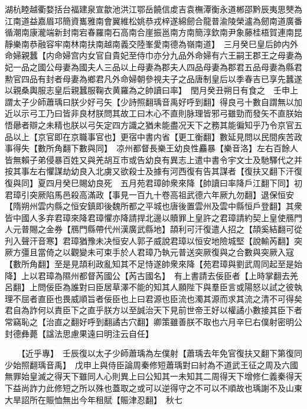 湖杭睦越衢婺括台福建泉宣歙池洪江鄂岳饒信䖍吉袁橅潭衡永道郴邵黔辰夷思僰為江南道益嘉眉邛簡資巂雅南會翼維松姚恭戎梓遂綿劒合龍普渝陵榮瀘為劒南道廣番循潮南康瀧端新封南宕春羅南石高南合崖振邕南方南簡淳欽南尹象藤桂梧賀連南昆靜樂南恭融容牢南林南扶南越南義交陸峯愛南德為嶺南道】　三月癸巳皇后帥内外命婦親蠶【内命婦宫内女官自貴妃至侍巾亦分九品外命婦有六王嗣王郡王之母妻為妃一品之國公母妻為國夫人三品以上母妻為郡夫人四品母妻為郡君五品母妻為縣君勲官四品有封者母妻為鄉君凡外命婦朝參視夫子之品唐制皇后以季春吉已享先蠶遂以親桑輿服志皇后親蠶服鞠衣黄羅為之帥讀曰率】　閏月癸丑朔日有食之　壬申上謂太子少師蕭瑀曰朕少好弓矢【少詩照翻瑀音禹好呼到翻】得良弓十數自謂無以加近以示弓工乃曰皆非良材朕問其故工曰木心不直則脉理皆邪弓雖勁而發矢不直朕始悟曏者辯之未精也朕以弓矢定四方識之猶未能盡况天下之務其能徧知乎乃令京官五品以上【京官即在京職事官也】更宿中書内省【更工衡翻】數延見問以民間疾苦政事得失【數所角翻下數與同】　凉州都督長樂王幼良性麤暴【樂音洛】左右百餘人皆無賴子弟侵暴百姓又與羌胡互市或告幼良有異志上遣中書令宇文士及馳驛代之并按其事左右懼謀劫幼良入北虜又欲殺士及據有河西復有告其謀者【復扶又翻下汗復復與同】夏四月癸巳賜幼良死　五月苑君璋帥衆來降【帥讀曰率降戶江翻下同】初君璋引突厥陷馬邑殺高滿政【事見一百九十卷高祖武德六年厥九勿翻】退保恒安【隋朔州雲内縣之恒安鎮即後魏所都之平城也唐後置雲州及雲中縣恒戶登翻】其衆皆中國人多弃君璋來降君璋懼亦降請捍北邊以贖罪上皇許之君璋請約契上皇使鴈門人元普賜之金券【鴈門縣帶代州漢廣武縣地】頡利可汗復遣人招之【頡奚結翻可從刋入聲汗音寒】君璋猶豫未决恒安人郭子威說君璋以恒安地險城堅【說輸芮翻】突厥方彊且當倚之以觀變未可束手於人君璋乃執元普送突厥復與之合數與突厥入寇【數所角翻】至是見頡利政亂知其不足恃遂帥衆來降【苑君璋與劉武周同起至是始降】上以君璋為隰州都督芮國公【芮古國名】　有上書請去佞臣者【上時掌翻去羌呂翻】上問佞臣為誰對曰臣居草澤不能的知其人願陛下與羣臣言或陽怒以試之彼執理不屈者直臣也畏威順旨者佞臣也上曰君源也臣流也濁其源而求其流之清不可得矣君自為詐何以責臣下之直乎朕方以至誠治天下見前世帝王好以權譎小數接其臣下者常竊恥之【治直之翻好呼到翻譎古穴翻】卿策雖善朕不取也六月辛巳右僕射密明公封德彝薨【諡法思慮果遠曰明注云自任】

　　【近乎專】　壬辰復以太子少師蕭瑀為左僕射【蕭瑀去年免官復扶又翻下第復同少始照翻瑀音禹】　戊申上與侍臣論周秦修短蕭瑀對曰紂為不道武王征之周及六國無罪始皇滅之得天下雖同人心則異上曰公知其一未知其二周得天下增修仁義秦得天下益尚詐力此修短之所以殊也蓋取之或可以逆得守之不可以不順故也瑀謝不及山東大旱詔所在賑恤無出今年租賦【賑津忍翻】　秋七

